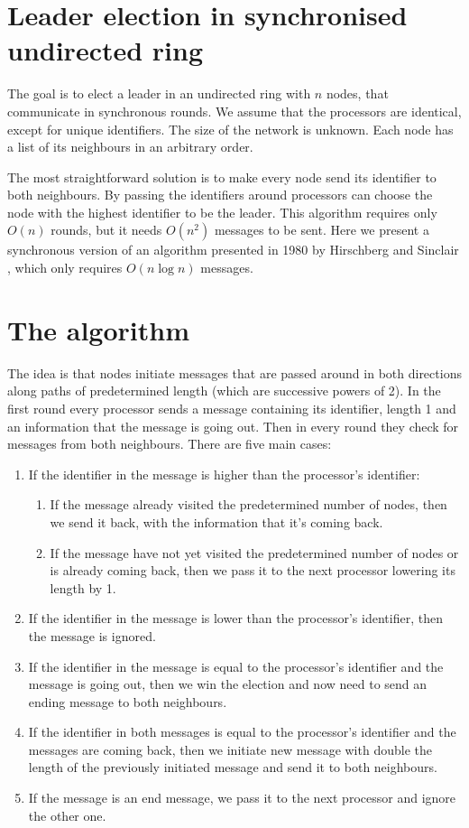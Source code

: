 \documentclass[a4paper,12pt]{article}
\begin{document}
\section{Leader election in synchronised undirected ring}
The goal is to elect a leader in an undirected ring with $n$ nodes, that communicate in synchronous rounds. We assume that the processors are identical, except for unique identifiers. The size of the network is unknown. Each node has a list of its neighbours in an arbitrary order.\par
The most straightforward solution is to make every node send its identifier to both neighbours. By passing the identifiers around processors can choose the node with the highest identifier to be the leader. This algorithm requires only $O(n)$ rounds, but it needs $O(n^2)$ messages to be sent. Here we present a synchronous version \cite{Iványi+2014+54+1} of an algorithm presented in 1980 by Hirschberg and Sinclair \cite{10.1145/359024.359029}, which only requires $O(n\log n)$ messages.

\section{The algorithm}
The idea is that nodes initiate messages that are passed around in both directions along paths of predetermined length (which are successive powers of 2). In the first round every processor sends a message containing its identifier, length 1 and an information that the message is going out. Then in every round they check for messages from both neighbours. There are five main cases:
\begin{enumerate}
    \item If the identifier in the message is higher than the processor's identifier:
    \begin{enumerate}
        \item If the message already visited the predetermined number of nodes, then we send it back, with the information that it's coming back.
        \item If the message have not yet visited the predetermined number of nodes or is already coming back, then we pass it to the next processor lowering its length by 1.
    \end{enumerate}
    \item If the identifier in the message is lower than the processor's identifier, then the message is ignored.
    \item If the identifier in the message is equal to the processor's identifier and the message is going out, then we win the election and now need to send an ending message to both neighbours.
    \item If the identifier in both messages is equal to the processor's identifier and the messages are coming back, then we initiate new message with double the length of the previously initiated message and send it to both neighbours.
    \item If the message is an end message, we pass it to the next processor and ignore the other one.
\end{enumerate}
\end{document}
